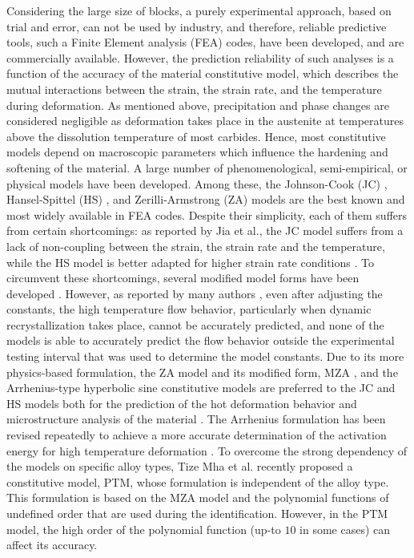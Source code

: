 \documentclass[twoside,english,1p,final,sort&compress]{elsarticle}
\makeatletter
\theoremstyle{plain}
\DeclareRobustCommand{\eal}{et al.\@\xspace}
\makeatother
\begin{document}
Considering the large size of blocks, a purely experimental approach, based on trial and error, can not be used by industry, and therefore, reliable predictive tools, such a Finite Element analysis (FEA) codes, have been developed, and are commercially available.
However, the prediction reliability of such analyses is a function of the accuracy of the material constitutive model, which describes the mutual interactions between the strain, the strain rate, and the temperature during deformation.
As mentioned above, precipitation and phase changes are considered negligible as deformation takes place in the austenite at temperatures above the dissolution temperature of most carbides.
Hence, most constitutive models depend on macroscopic parameters which influence the hardening and softening of the material.
A large number of phenomenological, semi-empirical, or physical models \cite{Rusinek-2010, Shin-2010, Lin-2011, Pantale-2021} have been developed.
Among these, the Johnson-Cook (JC) \cite{Johnson-1983}, Hansel-Spittel (HS) \cite{chadha2018approach}, and Zerilli-Armstrong (ZA) \cite{Zerilli-1987} models are the best known and most widely available in FEA codes.
Despite their simplicity, each of them suffers from certain shortcomings: as reported by Jia \eal \cite{Jia-2021}, the JC model suffers from a lack of non-coupling between the strain, the strain rate and the temperature, while the HS model is better adapted for higher strain rate conditions \cite{chadha2018approach}.
To circumvent these shortcomings, several modified model forms have been developed \cite{chadha2018approach, Rule-1998, Vural-2003, Lin-2010, Lin-2012}.
However, as reported by many authors \cite{Li-2013, Zhang-2015, Zhou-2019}, even after adjusting the constants, the high temperature flow behavior, particularly when dynamic recrystallization takes place, cannot be accurately predicted, and none of the models is able to accurately predict the flow behavior outside the experimental testing interval that was used to determine the model constants.
Due to its more physics-based formulation, the ZA model and its modified form, MZA \cite{NematNasser-2004, Lennon-2004, Muralli-2017, Cheng-2021, Muralli-2021}, and the Arrhenius-type hyperbolic sine constitutive models are preferred to the JC and HS models both for the prediction of the hot deformation behavior and microstructure analysis of the material \cite{Jonas-1969, Mostafaei-2012, Zhang-2012}.
The Arrhenius formulation has been revised repeatedly to achieve a more accurate determination of the activation energy for high temperature deformation \cite{Slooff-2007, Lin-2008-C}.
To overcome the strong dependency of the models on specific alloy types, Tize Mha \eal \cite{TizeMha-2022} recently proposed a constitutive model, PTM, whose formulation is independent of the alloy type.
This formulation is based on the MZA model and the polynomial functions of undefined order that are used during the identification.
However, in the PTM model, the high order of the polynomial function (up-to $10$ in some cases) can affect its accuracy.
\end{document}

